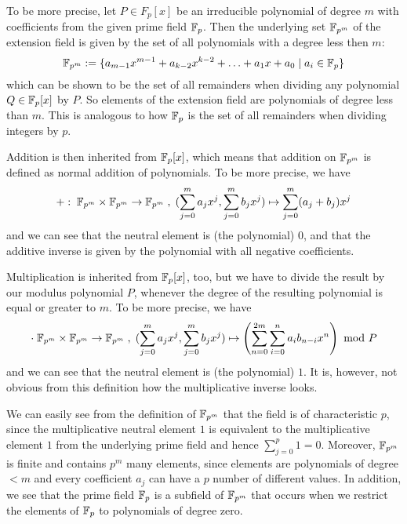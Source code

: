 To be more precise, let $P\in F_p[x]$ be an irreducible polynomial of degree $m$ with coefficients from the given prime field $\mathbb{F}_p$. Then the underlying set $\mathbb{F}_{p^m}$ of the extension field is given by the set of all polynomials with a degree less then $m$:
\begin{equation}
\mathbb{F}_{p^m}:=\{a_{m-1} x^{m-1}+a_{k-2}x^{k-2}+\ldots+a_1 x+a_0\;|\; a_i\in \mathbb{F}_p\}
\end{equation}
which can be shown to be the set of all remainders when dividing any polynomial $Q\in \mathbb{F}_p[x]$ by $P$. So elements of the extension field are polynomials of degree less than $m$. This is analogous to how $\mathbb{F}_p$ is the set of all remainders when dividing integers by $p$.

Addition is then inherited from $\mathbb{F}_p[x]$, which means that addition on $\mathbb{F}_{p^m}$ is defined as normal addition of polynomials. To be more precise, we have
\begin{equation}
+:\; \mathbb{F}_{p^m}\times \mathbb{F}_{p^m} \to \mathbb{F}_{p^m}\; ,\; (\sum_{j=0}^m a_j x^j,\sum_{j=0}^m b_j x^j)\mapsto \sum_{j=0}^m (a_j+b_j) x^j
\end{equation}
and we can see that the neutral element is (the polynomial) $0$, and that the additive inverse is given by the polynomial with all negative coefficients.

Multiplication is inherited from $\mathbb{F}_p[x]$, too, but we have to divide the result by our modulus polynomial $P$, whenever the degree of the resulting polynomial is equal or greater to $m$. To be more precise, we have
\begin{equation}
\cdot\; \mathbb{F}_{p^m}\times \mathbb{F}_{p^m} \to \mathbb{F}_{p^m}\; ,\; (\sum_{j=0}^m a_j x^j,\sum_{j=0}^m b_j x^j)\mapsto \left(\sum _{n = 0} ^{2m} \sum _{i = 0} ^{n}{a} _{i }{{b} _{n-i}}{x} ^{n}\right) \text{ mod } P
\end{equation}
and we can see that the neutral element is (the polynomial) $1$. It is, however, not obvious from this definition how the multiplicative inverse looks.

We can easily see from the definition of $\mathbb{F}_{p^m}$ that the field is of characteristic $p$, since the multiplicative neutral element $1$ is equivalent to the multiplicative element $1$ from the underlying prime field and hence $\sum_{j=0}^p 1=0$. Moreover, $\mathbb{F}_{p^m}$ is finite and contains $p^m$ many elements, since elements are polynomials of degree $<m$ and every coefficient $a_j$ can have a $p$ number of different values. In addition, we see that the prime field $\mathbb{F}_p$ is a subfield of $\mathbb{F}_{p^m}$ that occurs when we restrict the elements of $\mathbb{F}_{p}$ to polynomials of degree zero.

